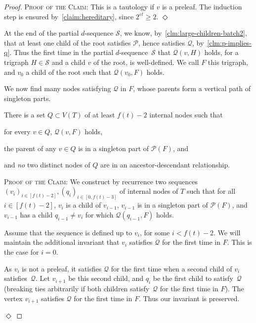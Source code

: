 \documentclass[a4paper,UKenglish,cleveref,hyperref,autoref]{lipics-v2021}
\renewcommand{\geq}{\geqslant}
\newcommand{\prel}{preleaf\xspace}
\newenvironment{proofofclaim}{\noindent \textsc{Proof of the Claim:}}{\hfill$\Diamond$\medskip}
\renewcommand{\P}{{\mathcal P}}
\begin{document}
\begin{proof}
\begin{proofofclaim}
  This is a tautology if $v$ is a \prel.
  The induction step is ensured by~\cref{claim:hereditary}, since $2^{\varepsilon t} \geq 2$.
\end{proofofclaim}

At the end of the partial $d$-sequence $\mathcal S$, we know, by~\cref{clm:large-children-batch2}, that at least one child of the root satisfies $\mathscr P$, hence satisfies $\mathscr Q$, by~\cref{clm:p-implies-q}.
Thus the first time in the partial $d$-sequence~$\mathcal S$ that $\mathscr Q(v,H)$ holds, for a trigraph $H \in \mathcal S$ and a child $v$ of the root, is well-defined. 
We call $F$ this trigraph, and $v_0$ a child of the root such that $\mathscr Q(v_0,F)$ holds.

We now find many nodes satisfying $\mathscr Q$ in $F$, whose parents form a vertical path of singleton parts.

\begin{claim} \label{claim:branches}
  There is a set $Q \subset V(T)$ of at least $f(t)-2$ internal nodes such that
  \begin{compactitem}
  \item for every $v \in Q$, $\mathscr Q(v,F)$ holds,
  \item the parent of any $v \in Q$ is in a singleton part of $\mathcal P(F)$, and
  \item and \emph{no} two distinct nodes of $Q$ are in an ancestor-descendant relationship.
  \end{compactitem}
\end{claim}

\begin{proofofclaim}
We construct by recurrence two sequences $(v_i)_{i\in [f(t)-2]}, (q_i)_{i\in [0,f(t)-3]}$ of internal nodes of $T$ such that for all $i \in [f(t)-2]$, $v_i$ is a child of $v_{i-1}$, $v_{i-1}$ is in a singleton part of $\P(F)$, and $v_{i-1}$ has a child $q_{i-1} \neq v_i$ for which $\mathscr Q(q_{i-1},F)$ holds.

Assume that the sequence is defined up to $v_i$, for some $i<f(t)-2$.
We will maintain the additional invariant that $v_i$ satisfies $\mathscr Q$ for the first time in $F$.
This is the case for $i=0$.

As $v_i$ is not a \prel, it satisfies $\mathscr Q$ for the first time when a second child of $v_i$ satisfies~$\mathscr Q$.
Let $v_{i+1}$ be this second child, and $q_i$ be the first child to satisfy~$\mathscr Q$ (breaking ties arbitrarily if both children satisfy~$\mathscr Q$ for the first time in $F$).
The vertex $v_{i+1}$ satisfies $\mathscr Q$ for the first time in $F$.
Thus our invariant is preserved.


\end{proofofclaim}
\end{proof}
\end{document}
